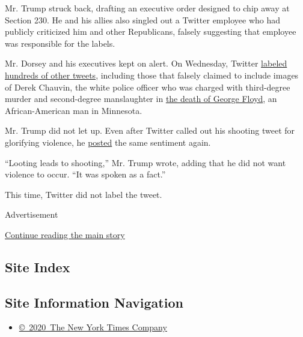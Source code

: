 Mr. Trump struck back, drafting an executive order designed to chip away
at Section 230. He and his allies also singled out a Twitter employee
who had publicly criticized him and other Republicans, falsely
suggesting that employee was responsible for the labels.

Mr. Dorsey and his executives kept on alert. On Wednesday, Twitter
\href{https://www.nytimes.com/2020/05/28/technology/trump-twitter-fact-check.html}{labeled
hundreds of other tweets}, including those that falsely claimed to
include images of Derek Chauvin, the white police officer who was
charged with third-degree murder and second-degree manslaughter in
\href{https://www.nytimes.com/2020/05/27/us/george-floyd-minneapolis-death.html}{the
death of George Floyd}, an African-American man in Minnesota.

Mr. Trump did not let up. Even after Twitter called out his shooting
tweet for glorifying violence, he
\href{https://twitter.com/realDonaldTrump/status/1266434153932894208}{posted}
the same sentiment again.

``Looting leads to shooting,'' Mr. Trump wrote, adding that he did not
want violence to occur. ``It was spoken as a fact.''

This time, Twitter did not label the tweet.

Advertisement

\protect\hyperlink{after-bottom}{Continue reading the main story}

\hypertarget{site-index}{%
\subsection{Site Index}\label{site-index}}

\hypertarget{site-information-navigation}{%
\subsection{Site Information
Navigation}\label{site-information-navigation}}

\begin{itemize}
\tightlist
\item
  \href{https://help.nytimes.com/hc/en-us/articles/115014792127-Copyright-notice}{©~2020~The
  New York Times Company}
\end{itemize}

